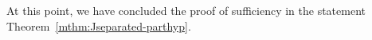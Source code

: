 \documentclass[12pt,reqno]{amsart}
\numberwithin{equation}{section}
\theoremstyle{plain}
\theoremstyle{definition}
\renewcommand{\epsilon}{\varepsilon}
\newcommand{\per}{\operatorname{Per}}
\begin{document}



At this point, we have concluded the proof of sufficiency in
the statement Theorem~\ref{mthm:Jseparated-parthyp}.
\end{document}
